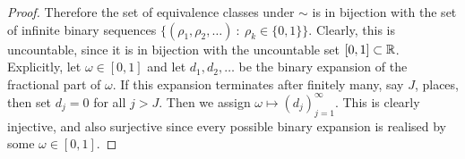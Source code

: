 \begin{enumerate}[label=(\alph*)]
\begin{proof}
    Therefore the set of equivalence classes under $\sim$ is in bijection with the set of infinite binary
    sequences $\{(\rho_1, \rho_2, \ldots) ~:~ \rho_k \in \{0, 1\}\}$. Clearly, this is uncountable, since it is
    in bijection with the uncountable set $[0, 1] \subset \mathbb{R}$. Explicitly, let $\omega \in [0, 1]$ and
    let $d_1, d_2, \ldots$ be the binary expansion of the fractional part of $\omega$. If this expansion
    terminates after finitely many, say $J$, places, then set $d_j = 0$ for all $j > J$. Then we
    assign $\omega \mapsto (d_j)_{j=1}^\infty$. This is clearly injective, and also surjective since every
    possible binary expansion is realised by some $\omega \in [0, 1]$.
  \end{proof}
\end{enumerate}
